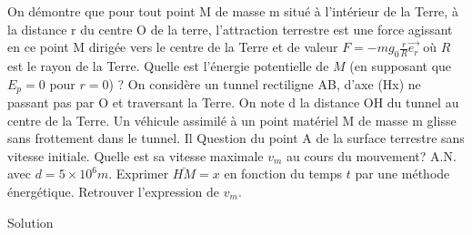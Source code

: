 \begin{Exercise}[title= Force de gravitation et tunnel terrestre]

  On démontre que pour tout point M de masse m situé à l’intérieur de la Terre, à la distance r du centre O de la terre, l’attraction terrestre est une force agissant en ce point M dirigée vers le centre de la Terre et de valeur $F=-m g_0\frac{r}{R} \overrightarrow{e_r}$ où $R$ est le rayon de la Terre.
  \Question Quelle est l'énergie potentielle de $M$ (en supposant que $E_p=0$ pour $r=0$) ?
  \Question  On considère un tunnel rectiligne AB, d’axe (Hx) ne passant pas par O et traversant la Terre. On note d la distance OH du tunnel au centre de la Terre. Un véhicule assimilé à un point matériel M de masse m glisse sans frottement dans le tunnel. Il Question du point A de la surface terrestre sans vitesse initiale.
  \subQuestion Quelle est sa vitesse maximale $v_m$ au cours du mouvement?  A.N. avec $d=5\times 10^6 m$.
  \subQuestion Exprimer $\bar{HM} = x$ en fonction du temps $t$ par une méthode énergétique. Retrouver l'expression de $v_m$.


\end{Exercise}
\begin{Answer}
  Solution
\end{Answer}
